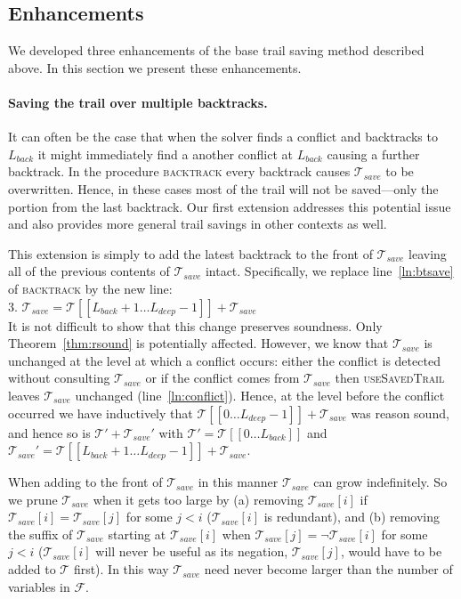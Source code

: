\documentclass[runningheads]{llncs}
\newcommand{\trail}{\ensuremath{\mathcal{T}}}
\newcommand{\range}[2]{#1\ldots#2}
\newcommand{\formula}{\ensuremath{\mathcal{F}}}
\newcommand{\deepestLvl}{L_{\textit{deep}}}
\newcommand{\btL}{L_{\textit{back}}}
\newcommand{\trailsave}{\trail_{\mathit{save}}}
\newcommand{\bt}{\textsc{backtrack}\xspace}
\newcommand{\ust}{\textsc{useSavedTrail}\xspace}
\begin{document}
\subsection{Enhancements}
We developed three enhancements of the base trail saving method
described above. In this section we present these enhancements.

\paragraph{Saving the trail over multiple backtracks.}
It can often be the case that when the solver finds a conflict and
backtracks to $\btL$ it might immediately find a another conflict at
$\btL$ causing a further backtrack. In the procedure \bt every
backtrack causes $\trailsave$ to be overwritten. Hence, in these cases
most of the trail will not be saved---only the portion from the last
backtrack. Our first extension addresses this potential issue and also
provides more general trail savings in other contexts as well.

This extension is simply to add the latest backtrack to the front of
$\trailsave$ leaving all of the previous contents of $\trailsave$
intact. Specifically, we replace line~\ref{ln:btsave} of \bt by the new line:\\
\hspace*{3em}3. \qquad $\trailsave = \trail[[\range{\btL{+}1}{\deepestLvl{-}1}]] + \trailsave$\\
It is not difficult to show that this change preserves soundness. Only
Theorem~\ref{thm:rsound} is potentially affected. However, we know
that $\trailsave$ is unchanged at the level at which a conflict
occurs: either the conflict is detected without consulting
$\trailsave$ or if the conflict comes from $\trailsave$ then \ust
leaves $\trailsave$ unchanged (line~\ref{ln:conflict}). Hence, at the
level before the conflict occurred we have inductively that
$\trail[[\range{0}{\deepestLvl{-}1}]]+\trailsave$ was reason sound,
and hence so is $\trail'+\trailsave'$ with
$\trail' = \trail[[\range{0}{\btL}]]$ and
$\trailsave' = \trail[[\range{\btL{+}1}{\deepestLvl{-}1}]] +
\trailsave$.

When adding to the front of $\trailsave$ in this manner $\trailsave$
can grow indefinitely. So we prune $\trailsave$ when it gets too large
by (a) removing $\trailsave[i]$ if $\trailsave[i] = \trailsave[j]$ for
some $j<i$ ($\trailsave[i]$ is redundant), and (b) removing the suffix
of $\trailsave$ starting at $\trailsave[i]$ when
$\trailsave[j] = \lnot \trailsave[i]$ for some $j<i$ ($\trailsave[i]$
will never be useful as its negation, $\trailsave[j]$, would have to be
added to $\trail$ first). In this way $\trailsave$ need never become
larger than the number of variables in $\formula$.
\end{document}
